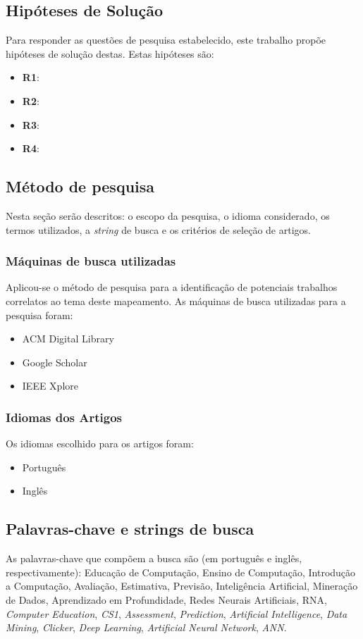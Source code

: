 \documentclass[
	12pt,				%
	openright,			%
	oneside,
	a4paper,			%
	english,			%
	french,				%
	spanish,			%
	brazil,				%
	]{abntex2}
\begin{document}
\subsection{Hipóteses de Solução}
\label{sec:HS}
Para responder as questões de pesquisa estabelecido, este trabalho propõe hipóteses de solução destas. Estas hipóteses são:
\begin{itemize}
    \item \textbf{R1}:
    \item \textbf{R2}:
    \item \textbf{R3}:
    \item \textbf{R4}:
\end{itemize}

\subsection{Método de pesquisa}
\label{sec:MP}
Nesta seção serão descritos: o escopo da pesquisa, o idioma considerado, os termos utilizados, a \textit{string} de busca e os critérios de seleção de artigos.

\subsubsection{Máquinas de busca utilizadas}
Aplicou-se o método de pesquisa para a identificação de potenciais trabalhos correlatos ao tema deste mapeamento. As máquinas de busca utilizadas para a pesquisa foram:
\begin{itemize}
    \item ACM Digital Library
    \item Google Scholar
    \item IEEE Xplore
\end{itemize}

\subsubsection{Idiomas dos Artigos}
Os idiomas escolhido para os artigos foram:

\begin{itemize}
    \item Português
    \item Inglês
\end{itemize}

\subsection{Palavras-chave e strings de busca}
As palavras-chave que compõem a busca são (em português e inglês, respectivamente): 
Educação de Computação, Ensino de Computação, Introdução a Computação, Avaliação, Estimativa, Previsão, Inteligência Artificial, Mineração de Dados, Aprendizado em Profundidade, Redes Neurais Artificiais, RNA, \textit{Computer Education}, \textit{CS1}, \textit{Assessment}, \textit{Prediction}, \textit{Artificial Intelligence}, \textit{Data Mining}, \textit{Clicker}, \textit{Deep Learning}, \textit{Artificial Neural Network}, \textit{ANN}.
\end{document}
